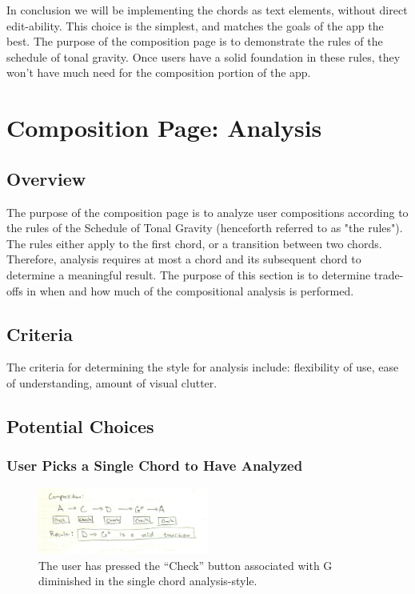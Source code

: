 \documentclass[onecolumn, draftclsnofoot,10pt, compsoc]{IEEEtran}
\begin{document}
In conclusion we will be implementing the chords as text elements, without direct edit-ability. 
This choice is the simplest, and matches the goals of the app the best. 
The purpose of the composition page is to demonstrate the rules of the schedule of tonal gravity. 
Once users have a solid foundation in these rules, they won't have much need for the composition portion of the app. 
 
\section{Composition Page: Analysis}
\subsection{Overview}
The purpose of the composition page is to analyze user compositions according to the rules of the Schedule of Tonal Gravity (henceforth referred to as "the rules").
The rules either apply to the first chord, or a transition between two chords.
Therefore, analysis requires at most a chord and its subsequent chord to determine a meaningful result.
The purpose of this section is to determine trade-offs in when and how much of the compositional analysis is performed.

\subsection{Criteria}
The criteria for determining the style for analysis include:
flexibility of use,
ease of understanding,
amount of visual clutter.

\subsection{Potential Choices}
\subsubsection{User Picks a Single Chord to Have Analyzed}
\begin{figure}[h]
  \includegraphics[width=0.5\textwidth]{analyze-each.png}
  \caption{The user has pressed the ``Check'' button associated with G diminished in the single chord analysis-style.}
\end{figure}
\end{document}
